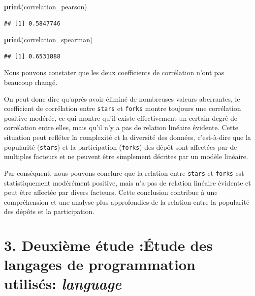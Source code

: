 \documentclass[
]{article}
\newenvironment{Shaded}{\begin{snugshade}}{\end{snugshade}}
\newcommand{\FunctionTok}[1]{\textcolor[rgb]{0.13,0.29,0.53}{\textbf{#1}}}
\newcommand{\NormalTok}[1]{#1}
\begin{document}
\begin{Shaded}
\begin{Highlighting}[]
\FunctionTok{print}\NormalTok{(correlation\_pearson)}
\end{Highlighting}
\end{Shaded}

\begin{verbatim}
## [1] 0.5847746
\end{verbatim}

\begin{Shaded}
\begin{Highlighting}[]
\FunctionTok{print}\NormalTok{(correlation\_spearman)}
\end{Highlighting}
\end{Shaded}

\begin{verbatim}
## [1] 0.6531888
\end{verbatim}

Nous pouvons constater que les deux coefficients de corrélation n'ont
pas beaucoup changé.

On peut donc dire qu'après avoir éliminé de nombreuses valeurs
aberrantes, le coefficient de corrélation entre \texttt{stars} et
\texttt{forks} montre toujours une corrélation positive modérée, ce qui
montre qu'il existe effectivement un certain degré de corrélation entre
elles, mais qu'il n'y a pas de relation linéaire évidente. Cette
situation peut refléter la complexité et la diversité des données,
c'est-à-dire que la popularité (\texttt{stars}) et la participation
(\texttt{forks}) des dépôt sont affectées par de multiples facteurs et
ne peuvent être simplement décrites par un modèle linéaire.

Par conséquent, nous pouvons conclure que la relation entre
\texttt{stars} et \texttt{forks} est statistiquement modérément
positive, mais n'a pas de relation linéaire évidente et peut être
affectée par divers facteurs. Cette conclusion contribue à une
compréhension et une analyse plus approfondies de la relation entre la
popularité des dépôts et la participation.

\section{\texorpdfstring{3. Deuxième étude :Étude des langages de
programmation utilisés:
\textbf{\emph{language}}}{3. Deuxième étude :Étude des langages de programmation utilisés: language}}\label{deuxiuxe8me-uxe9tude-uxe9tude-des-langages-de-programmation-utilisuxe9s-language}
\end{document}
